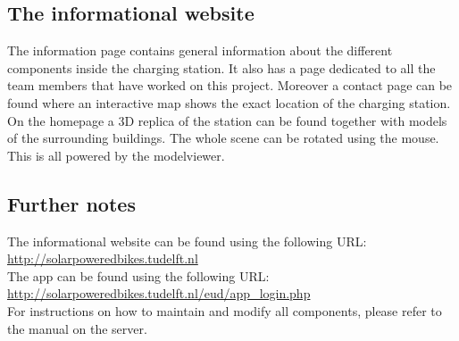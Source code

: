 \subsection{The informational website}

The information page contains general information about the different components inside the charging station. It also has a page dedicated to all the team members that have worked on this project. Moreover a contact page can be found where an interactive map shows the exact location of the charging station. On the homepage a 3D replica of the station can be found together with models of the surrounding buildings. The whole scene can be rotated using the mouse. This is all powered by the modelviewer.

\subsection{Further notes}

The informational website can be found using the following URL: \url{http://solarpoweredbikes.tudelft.nl}\\
The app can be found using the following URL: \url{http://solarpoweredbikes.tudelft.nl/eud/app_login.php}\\

\noindent
For instructions on how to maintain and modify all components, please refer to the manual on the server.




